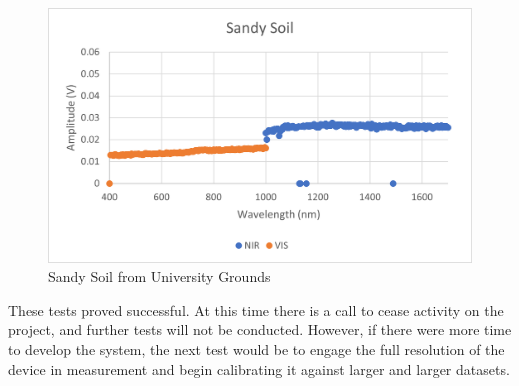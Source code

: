 \begin{figure}[H]
    \caption{Sandy Soil from University Grounds}
    \centering
    \includegraphics[scale=0.5]{images/Data3.png}
\end{figure}

These tests proved successful. At this time there is a call to cease activity on the project, and further tests will not be conducted. However, if there were more time to develop the system, the next test would be to engage the full resolution of the device in measurement and begin calibrating it against larger and larger datasets.
